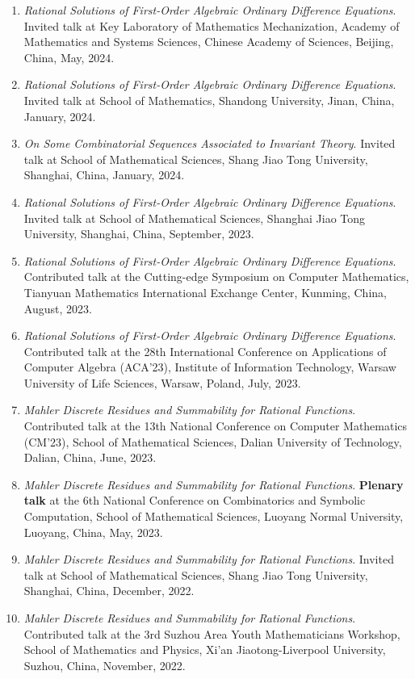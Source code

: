 \documentclass[a4paper,12pt]{article}
\begin{document}
\begin{enumerate}
\item {\em Rational Solutions of First-Order Algebraic Ordinary Difference Equations}. 
Invited talk at Key Laboratory of Mathematics Mechanization, Academy of Mathematics and Systems Sciences, Chinese Academy of Sciences, Beijing, China, May, 2024. 
\item {\em Rational Solutions of First-Order Algebraic Ordinary Difference Equations}. 
Invited talk at School of Mathematics, Shandong University, Jinan, China, January, 2024. 
\item {\em On Some Combinatorial Sequences Associated to Invariant Theory}. 
Invited talk at School of Mathematical Sciences, Shang Jiao Tong University, Shanghai, China, January, 2024. 
\item {\em Rational Solutions of First-Order Algebraic Ordinary Difference Equations}. 
Invited talk at School of Mathematical Sciences, Shanghai Jiao Tong University, Shanghai, China, September, 2023.
\item {\em Rational Solutions of First-Order Algebraic Ordinary Difference Equations}. 
Contributed talk at the Cutting-edge Symposium on Computer Mathematics, Tianyuan Mathematics International Exchange Center, Kunming, China, August, 2023.
\item {\em Rational Solutions of First-Order Algebraic Ordinary Difference Equations}. 
Contributed talk at the 28th International Conference on Applications of Computer Algebra (ACA'23), Institute of Information Technology, Warsaw University of Life Sciences, Warsaw, Poland, July, 2023.
\item {\em Mahler Discrete Residues and Summability for Rational Functions}. 
Contributed talk at the 13th National Conference on Computer Mathematics (CM'23), School of Mathematical Sciences, Dalian University of Technology, Dalian, China, June, 2023. 
\item {\em Mahler Discrete Residues and Summability for Rational Functions}. 
\textbf{Plenary talk} at the 6th National Conference on Combinatorics and Symbolic Computation, School of Mathematical Sciences, Luoyang Normal University, Luoyang, China, May, 2023. 
\item {\em Mahler Discrete Residues and Summability for Rational Functions}. 
Invited talk at School of Mathematical Sciences, Shang Jiao Tong University, Shanghai, China, December, 2022. 
\item {\em Mahler Discrete Residues and Summability for Rational Functions}. 
Contributed talk at the 3rd Suzhou Area Youth Mathematicians Workshop, School of Mathematics and Physics, Xi'an Jiaotong-Liverpool  University, Suzhou, China, November, 2022. 

\end{enumerate}
\end{document}
